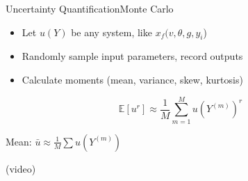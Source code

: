 \documentclass{beamer}
\newcommand{\expv}[1]{\ensuremath{\mathbb{E}[ #1]}}
\begin{document}
\begin{frame}{Uncertainty Quantification}{Monte Carlo}\vspace{-30pt}
\begin{itemize}
\item Let $u(Y)$ be any system, like $x_f(v,\theta,g,y_i$)
\item Randomly sample input parameters, record outputs
\item Calculate moments (mean, variance, skew, kurtosis)
\end{itemize}
\[\expv{u^r}\approx\frac{1}{M}\sum_{m=1}^M u\left(Y^{(m)}\right)^r\]%
\centerline{Mean: $\bar u\approx\frac{1}{M}\sum u\left(Y^{(m)}\right)$}
(video)
\end{frame}
\end{document}
